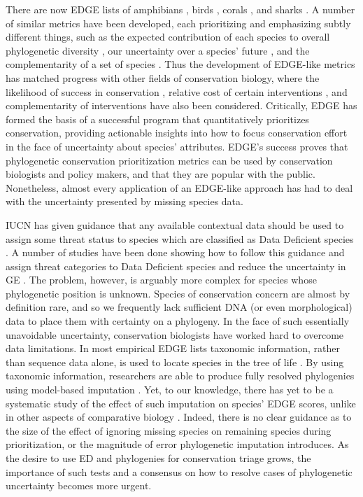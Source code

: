 \documentclass[12pt,english]{article}
\begin{document}
There are now EDGE lists of amphibians \autocite{Isaac2012}, birds 
\autocite{Jetz2014}, corals \autocite{Curnick2015}, and sharks
\autocite{Stein2018}. A number of similar metrics  have been developed, each
prioritizing and emphasizing subtly different things, such as the expected
contribution of each species to overall phylogenetic diversity
\autocite[HEDGE;][]{Steel2007}, our uncertainty over a species' future
\autocite[EDAM;][]{Pearse2015}, and the complementarity of a set of species
\autocite{Faith2008,Jensen2016}. Thus the development of EDGE-like metrics has
matched progress with other fields of conservation biology, where the likelihood
of success in conservation \autocite{Wilson2007, Mcbride2007}, relative cost of
certain interventions \autocite{Naidoo2006}, and complementarity of
interventions \autocite{Pressey1993, Myers2000} have also been considered.
Critically, EDGE has formed the basis of a successful program that
quantitatively prioritizes conservation, providing actionable insights into how
to focus conservation effort in the face of uncertainty about species'
attributes. EDGE's success proves that phylogenetic conservation prioritization
metrics can be used by conservation biologists and policy makers, and that they
are popular with the public. Nonetheless, almost every application of an
EDGE-like approach has had to deal with the uncertainty presented by missing
species data.

IUCN has given guidance that any available contextual data should be used to
assign some threat status to species which are classified as Data Deficient
species \autocite{Iucn2001, Iucn2008}. A number of studies have been done
showing how to follow this guidance and assign threat categories to Data
Deficient species and reduce the uncertainty in GE \autocite{Good2006,
Butchart2010, Morais2013}. The problem, however, is arguably more complex for
species whose phylogenetic position is unknown. Species of conservation concern
are almost by definition rare, and so we frequently lack sufficient DNA (or even
morphological) data to place them with certainty on a phylogeny. In the face of
such essentially unavoidable uncertainty, conservation biologists have worked
hard to overcome data limitations. In most empirical EDGE lists taxonomic
information, rather than sequence data alone, is used to locate species in the
tree of life \autocite{Isaac2007, Isaac2012, Collen2011, Jetz2014, Curnick2015,
Stein2018, Gumbs2017}. By using taxonomic information, researchers are
able to produce fully resolved phylogenies using model-based imputation
\autocite{Kuhn2011, Thomas2013}. Yet, to our knowledge, there has yet to be a
systematic study of the effect of such imputation on species' EDGE scores,
unlike in other aspects of comparative biology \autocite{Rabosky2014}. Indeed,
there is no clear guidance as to the size of the effect of ignoring missing
species on remaining species during prioritization, or the magnitude of error
phylogenetic imputation introduces. As the desire to use ED and phylogenies for
conservation triage grows, the importance of such tests and a consensus on how
to resolve cases of phylogenetic uncertainty becomes more urgent.
\end{document}
